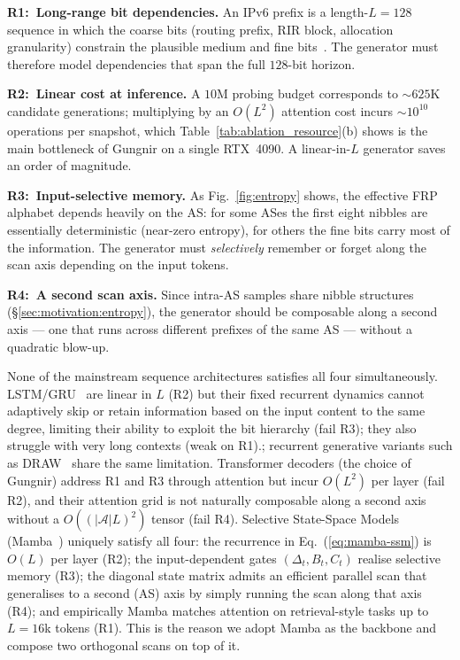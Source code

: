 \documentclass[conference]{IEEEtran}
\begin{document}
\textbf{R1:~Long-range bit dependencies.}  An IPv6 prefix is a
length-$L{=}128$ sequence in which the coarse bits (routing
prefix, RIR block, allocation granularity) constrain the
plausible medium and fine
bits~\cite{hinden2006rfc4291,deering1998ipv6}.  The generator
must therefore model dependencies that span the full $128$-bit
horizon.

\textbf{R2:~Linear cost at inference.}  A $10$M probing budget
corresponds to $\sim\!625$K candidate generations; multiplying
by an $O(L^2)$ attention cost incurs $\sim\!10^{10}$ operations
per snapshot, which Table~\ref{tab:ablation_resource}(b) shows
is the main bottleneck of Gungnir on a single RTX~4090.  A
linear-in-$L$ generator saves an order of magnitude.

\textbf{R3:~Input-selective memory.}  As Fig.~\ref{fig:entropy}
shows, the effective FRP alphabet depends heavily on the AS:
for some ASes the first eight nibbles are essentially
deterministic (near-zero entropy), for others the fine bits
carry most of the information.  The generator must
\emph{selectively} remember or forget along the scan axis
depending on the input tokens.

\textbf{R4:~A second scan axis.}  Since intra-AS samples share
nibble structures (\S\ref{sec:motivation:entropy}), the
generator should be composable along a second axis --- one that
runs across different prefixes of the same AS --- without a
quadratic blow-up.

None of the mainstream sequence architectures satisfies all
four simultaneously.  LSTM/GRU~\cite{medsker2001rnn} are linear in $L$ (R2) but their fixed recurrent dynamics cannot adaptively skip or retain information based on the input content to the same degree, limiting their ability to exploit the bit hierarchy (fail R3); they also struggle with very long contexts (weak on R1).; recurrent generative variants such as
DRAW~\cite{gregor2015draw} share the same limitation.  Transformer decoders (the choice of
Gungnir) address R1 and R3 through attention but incur $O(L^2)$
per layer (fail R2), and their attention grid is not naturally
composable along a second axis without a
$O((|\mathcal{A}|L)^2)$ tensor (fail R4).  Selective State-Space
Models (Mamba~\cite{gu2023mamba,gu2021s4}) uniquely satisfy all
four: the recurrence in Eq.~(\ref{eq:mamba-ssm}) is $O(L)$ per
layer (R2); the input-dependent gates $(\Delta_t,B_t,C_t)$
realise selective memory (R3); the diagonal state matrix admits
an efficient parallel scan that generalises to a second (AS)
axis by simply running the scan along that axis (R4); and
empirically Mamba matches attention on retrieval-style tasks up
to $L\!=\!16$k tokens (R1).  This is the reason we adopt Mamba
as the backbone and compose two orthogonal scans on top of it.
\end{document}
